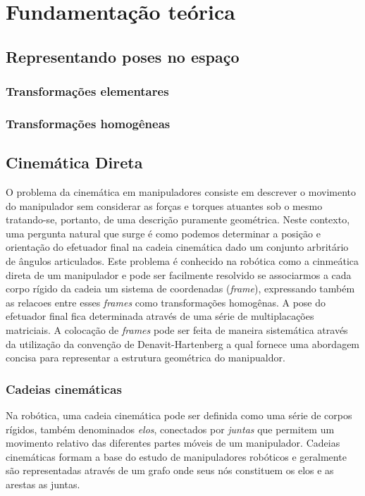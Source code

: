 \chapter{Fundamentação teórica}\label{cap:background}

\section{Representando poses no espaço}

\subsection{Transformações elementares}

\subsection{Transformações homogêneas}

\section{Cinemática Direta}

O problema da cinemática em manipuladores consiste em descrever o movimento do manipulador sem considerar as forças e torques atuantes sob o mesmo tratando-se, portanto, de uma descrição puramente geométrica. Neste contexto, uma pergunta natural que surge é como podemos determinar a posição e orientação do efetuador final na cadeia cinemática dado um conjunto arbritário de ângulos articulados. Este problema é conhecido na robótica como a cinmeática direta de um manipulador e pode ser facilmente resolvido se associarmos a cada corpo rígido da cadeia um sistema de coordenadas (\emph{frame}), expressando também as relacoes entre esses \emph{frames} como transformações homogênas. A pose do efetuador final fica determinada através de uma série de multiplacações matriciais. A colocação de \emph{frames} pode ser feita de maneira sistemática através da utilização da convenção de Denavit-Hartenberg a qual fornece uma abordagem concisa para representar a estrutura geométrica do manipualdor.

\subsection{Cadeias cinemáticas}

Na robótica, uma cadeia cinemática pode ser definida como uma série de corpos rígidos, também denominados \emph{elos}, conectados por \emph{juntas} que permitem um movimento relativo das diferentes partes móveis de um manipulador. Cadeias cinemáticas formam a base do estudo de manipuladores robóticos e geralmente são representadas através de um grafo onde seus nós constituem os elos e as arestas as juntas.

